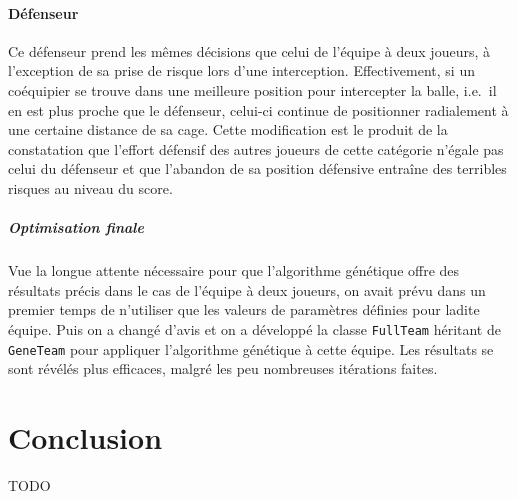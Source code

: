 \documentclass[12pt,a4paper]{article}
\begin{document}
\subsection*{D\'efenseur}
Ce d\'efenseur prend les m\^emes d\'ecisions que celui de l'\'equipe \`a 
deux joueurs, \`a l'exception de sa prise de risque lors d'une interception. 
Effectivement, si un co\'equipier se trouve dans une meilleure position pour 
intercepter la balle, i.e.\ il en est plus proche que le d\'efenseur, celui-ci 
continue de positionner radialement \`a une certaine distance de sa cage. Cette 
modification est le produit de la constatation que l'effort d\'efensif des 
autres joueurs de cette cat\'egorie n'\'egale pas celui du d\'efenseur et que 
l'abandon de sa position d\'efensive entra\^ine des terribles risques au 
niveau du score.

\subsubsection*{Optimisation finale}
Vue la longue attente n\'ecessaire pour que l'algorithme g\'en\'etique offre 
des r\'esultats pr\'ecis dans le cas de l'\'equipe \`a deux joueurs, on avait 
pr\'evu dans un premier temps de n'utiliser que les valeurs de param\`etres 
d\'efinies pour ladite \'equipe. Puis on a chang\'e d'avis et on a 
d\'evelopp\'e la classe \texttt{FullTeam} h\'eritant de \texttt{GeneTeam} pour 
appliquer l'algorithme g\'en\'etique \`a cette \'equipe. Les r\'esultats se 
sont r\'ev\'el\'es plus efficaces, malgr\'e les peu nombreuses it\'erations 
faites.

\newpage

\part*{Conclusion}
TODO

\end{document}
